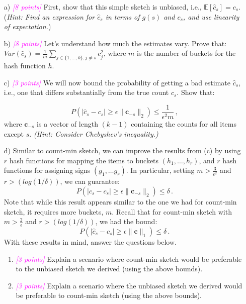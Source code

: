 \documentclass{exam}
\newcommand{\E}{\mathbb{E}}
\newcommand{\grade}[1]{\small\textcolor{magenta}{\emph{[#1 points]}} \normalsize}
\begin{document}
\begin{itemize}

\item[{a)}] \grade{8} First, show that this simple sketch is unbiased, i.e., $\E[\hat{c}_s] = c_s$. (\textit{Hint: Find an expression for $\hat{c}_s$ in terms of $g(s)$ and $c_s$, and use linearity of expectation.})  \\

\newpage
\item[{b)}] \grade{8} Let's understand how much the estimates vary. Prove that: $Var(\hat{c}_s) = \frac{1}{m}\sum_{j \in \{1, \dots, k\}, j \neq s} c_j^2$, where $m$ is the number of buckets for the hash function $h$.



\newpage
\item[{c)}] \grade{3} We will now bound the probability of getting a bad
  estimate $\hat{c}_s$, i.e., one that differs substantially from the true count $c_s$. Show that:

\[
P(|\hat{c}_s - c_s| \ge \epsilon \|\mathbf{c}_{-s}\|_2) \le \frac{1}{\epsilon^2 m}\, ,
\]
where $\mathbf{c}_{-s}$ is a vector of length $(k - 1)$ containing the counts for all items except $s$. \textit{(Hint: Consider Chebyshev's inequality.)} \\


\newpage
\item[{d)}] Similar to count-min sketch, we can improve the results from (c) by using $r$ hash functions for mapping the items to buckets $(h_1, \dots, h_r)$, and $r$ hash functions for assigning signs $(g_1, \dots g_r)$. In particular, setting $m > \frac{3}{\epsilon^2}$ and $r > (log(1/\delta))$, we can guarantee: 
$$
P(|\hat{c}_s - c_s| \ge \epsilon \|\mathbf{c}_{-s}\|_2) \le \delta\, .
$$
Note that while this result appears similar to the one we had for count-min sketch, it requires more buckets, $m$. Recall that for count-min sketch with $m > \frac{2}{\epsilon}$ and $r > (log(1/\delta))$, we had the bound:
$$
P(|\hat{c}_s - c_s| \ge \epsilon \|\mathbf{c}\|_1) \le \delta \, .
$$
With these results in mind, answer the questions below. 
\begin{enumerate}[label=\roman*.]
\item \grade{3} Explain a scenario where count-min sketch would be preferable to the unbiased sketch we derived (using the above bounds). \\

\vspace{8em}

\item \grade{3} Explain a scenario where the unbiased sketch we derived would be preferable to count-min sketch (using the above bounds). \\


\end{enumerate}

\end{itemize}
\end{document}
